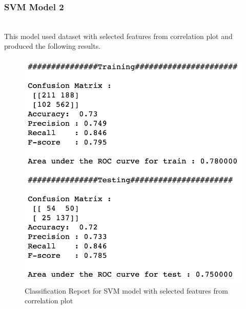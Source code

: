 \documentclass[format=sigconf]{acmart}
\begin{document}
\subsubsection{SVM Model 2}
\hfill\\
This model used dataset with selected features from correlation plot and produced the following results.

\begin{figure}[H]
    \centering
    \includegraphics[scale=0.50]{images/SVM_Model_2_results.png}
    \caption{Classification Report for SVM model with selected features from correlation plot}
    \label{fig:svmmodel2}
\end{figure}
\end{document}
